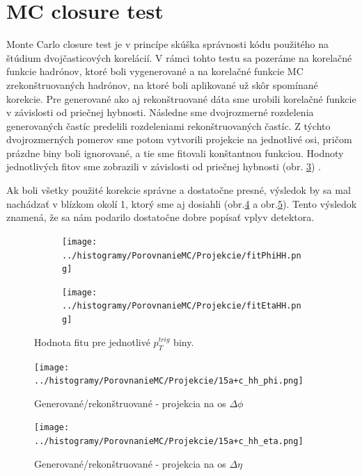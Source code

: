 \documentclass[thesismargins, thesislinespacing]{rnthesis}
\begin{document}
\section{MC closure test}

Monte Carlo closure test je v princípe skúška správnosti kódu použitého na štúdium dvojčasticových korelácií. V rámci tohto testu sa pozeráme na korelačné \-funk\-cie hadrónov, ktoré boli vygenerované a na korelačné funkcie MC zrekonštruovaných hadrónov, na ktoré boli aplikované už skôr spomínané korekcie. Pre generované ako aj rekonštruované dáta sme urobili korelačné funkcie v závislosti od priečnej hybnosti. Následne sme dvojrozmerné rozdelenia generovaných častíc predelili rozdeleniami rekonštruovaných častíc. Z týchto dvojrozmerných pomerov sme potom vytvorili projekcie na jednotlivé osi, pričom prázdne biny boli ignorované, a tie sme fitovali konštantnou funkciou. Hodnoty jednotlivých fitov sme zobrazili v závislosti od priečnej hybnosti (obr. \ref{fitMC}) . 

Ak boli všetky použité korekcie správne a dostatočne presné, výsledok by sa mal nachádzať v blízkom okolí 1, ktorý sme aj dosiahli  (obr.\ref{hphi} a obr.\ref{heta}). Tento výsledok znamená, že sa nám podarilo dostatočne dobre popísať vplyv detektora.  

\begin{figure}
	\centering
	\begin{subfigure}{0.5\textwidth}
		\centering
		\texttt{[image: ../histogramy/PorovnanieMC/Projekcie/fitPhiHH.png]}
		\caption{}
		\label{fitPhi}
	\end{subfigure}%
	\begin{subfigure}{0.5\textwidth}
		\centering
		\texttt{[image: ../histogramy/PorovnanieMC/Projekcie/fitEtaHH.png]}
		\caption{}
		\label{fitEta}
	\end{subfigure}
	\caption{Hodnota fitu pre jednotlivé $p_{T}^{trig}$ biny.}
	\label{fitMC}
\end{figure}

\begin{figure}
	\centering
	\texttt{[image: ../histogramy/PorovnanieMC/Projekcie/15a+c\_hh\_phi.png]}
	\caption{Generované/rekonštruované - projekcia na os $\Delta \phi$ }
	\label{hphi}
\end{figure}

\begin{figure}
	\centering
	\texttt{[image: ../histogramy/PorovnanieMC/Projekcie/15a+c\_hh\_eta.png]}
	\caption{Generované/rekonštruované - projekcia na os $\Delta \eta$ }
	\label{heta}
\end{figure}
\end{document}

